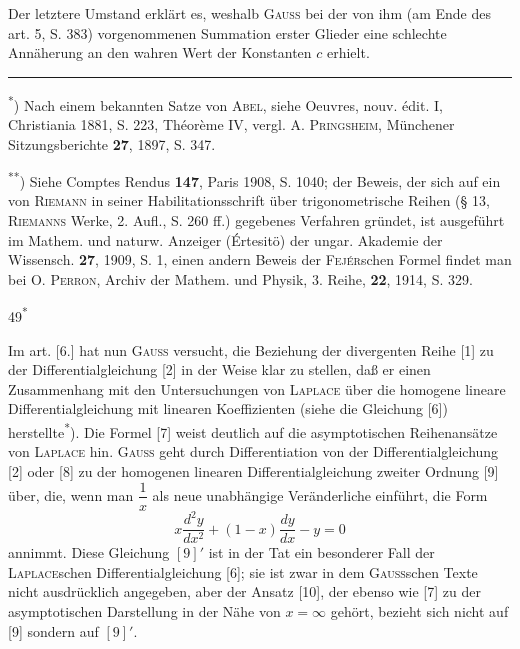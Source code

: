 \indent Der letztere Umstand erklärt es, weshalb \textsc{Gauss} bei der von ihm (am Ende des art. 5, S. 383) vorgenommenen Summation erster Glieder eine schlechte Annäherung an den wahren Wert der Konstanten \(c\) erhielt.
\par\medskip\noindent\rule{.24\linewidth}{.4pt}\par\smallskip
{\footnotesize
\noindent\hspace*{\parindent}\textsuperscript{*}) Nach einem bekannten Satze von \textsc{Abel}, siehe Oeuvres, nouv. édit. I, Christiania 1881, S. 223, Théorème IV, vergl. A. \textsc{Pringsheim}, Münchener Sitzungsberichte \textbf{27}, 1897, S. 347.
\par\noindent\hspace*{\parindent}\textsuperscript{**}) Siehe Comptes Rendus \textbf{147}, Paris 1908, S. 1040; der Beweis, der sich auf ein von \textsc{Riemann} in seiner Habilitationsschrift über trigonometrische Reihen (§ 13, \textsc{Riemanns} Werke, 2. Aufl., S. 260 ff.) gegebenes Verfahren gründet, ist ausgeführt im Mathem. und naturw. Anzeiger (Értesitö) der ungar. Akademie der Wissensch. \textbf{27}, 1909, S. 1, einen andern Beweis der \textsc{Fejér}schen Formel findet man bei O. \textsc{Perron}, Archiv der Mathem. und Physik, 3. Reihe, \textbf{22}, 1914, S. 329.
\par}
\begin{flushright}49\textsuperscript{*}\end{flushright}
\clearpage{}
\indent Im art. [6.] hat nun \textsc{Gauss} versucht, die Beziehung der divergenten Reihe [1] zu der Differentialgleichung [2] in der Weise klar zu stellen, daß er einen Zusammenhang mit den Untersuchungen von \textsc{Laplace} über die homogene lineare Differentialgleichung mit linearen Koeffizienten (siehe die Gleichung [6]) herstellte\textsuperscript{*}). Die Formel [7] weist deutlich auf die asymptotischen Reihenansätze von \textsc{Laplace} hin. \textsc{Gauss} geht durch Differentiation von der Differentialgleichung [2] oder [8] zu der homogenen linearen Differentialgleichung zweiter Ordnung [9] über, die, wenn man \(\dfrac1x\) als neue unabhängige Veränderliche einführt, die Form
\begin{equation}
x\frac{d^2y}{dx^2}+(1-x)\frac{dy}{dx}-y=0\tag*{\([9]'\)}
\end{equation}
\noindent annimmt. Diese Gleichung \([9]'\) ist in der Tat ein besonderer Fall der \textsc{Laplace}schen Differentialgleichung [6]; sie ist zwar in dem \textsc{Gauss}schen Texte nicht ausdrücklich angegeben, aber der Ansatz [10], der ebenso wie [7] zu der asymptotischen Darstellung in der Nähe von \(x=\infty\) gehört, bezieht sich nicht auf [9] sondern auf \([9]'\).

